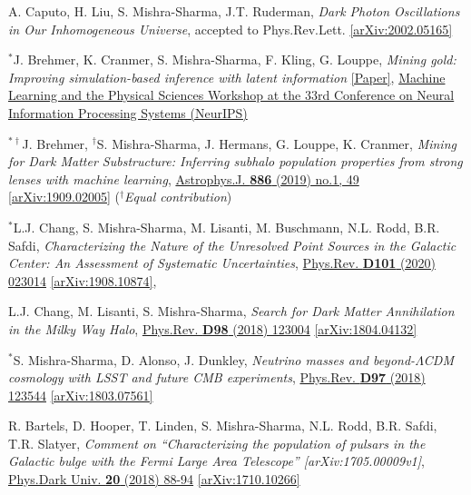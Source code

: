 \documentclass[11pt]{article}
\newenvironment{packed_enumerate}[1][]{
\begin{etaremune}[#1]
  \setlength{\itemsep}{3pt}
  \setlength{\parskip}{0pt}
  \setlength{\parsep}{0pt}}{\end{etaremune}
}
\begin{document}
\begin{packed_enumerate}[start=24]
\item A. Caputo, H. Liu, S. Mishra-Sharma, J.T. Ruderman, \emph{Dark Photon Oscillations in Our Inhomogeneous Universe}, accepted to Phys.Rev.Lett. \href{https://arxiv.org/abs/2002.05165}{[arXiv:2002.05165]}

\item $^*$J. Brehmer, K. Cranmer, S. Mishra-Sharma, F. Kling, G. Louppe,  \emph{Mining gold: Improving simulation-based inference with latent information} \href{https://ml4physicalsciences.github.io/files/NeurIPS_ML4PS_2019_16.pdf}{[Paper]}, \href{https://ml4physicalsciences.github.io/}{Machine Learning and the Physical Sciences Workshop at the 33rd Conference on Neural Information Processing Systems (NeurIPS)}

\item $^{*\dagger}$J. Brehmer, $^\dagger$S. Mishra-Sharma, J. Hermans, G. Louppe, K. Cranmer, \emph{Mining for Dark Matter Substructure: Inferring subhalo population properties from strong lenses with machine learning}, \href{https://iopscience.iop.org/article/10.3847/1538-4357/ab4c41}{Astrophys.J. \textbf{886} (2019) no.1, 49} \href{https://arxiv.org/abs/1909.02005}{[arXiv:1909.02005]} ($^\dagger$\emph{Equal contribution})

\item $^*$L.J. Chang, S. Mishra-Sharma, M. Lisanti, M. Buschmann, N.L. Rodd, B.R. Safdi, \emph{Characterizing the Nature of the Unresolved Point Sources in the Galactic Center: An Assessment of Systematic Uncertainties},  \href{https://journals.aps.org/prd/abstract/10.1103/PhysRevD.101.023014}{Phys.Rev. \textbf{D101} (2020) 023014} \href{https://arxiv.org/abs/1908.10874}{[arXiv:1908.10874]}, 

\item L.J. Chang, M. Lisanti, S. Mishra-Sharma, \emph{Search for Dark Matter Annihilation in the Milky Way Halo}, \href{https://journals.aps.org/prd/abstract/10.1103/PhysRevD.98.123004}{Phys.Rev. \textbf{D98} (2018) 123004} \href{https://arxiv.org/abs/1804.04132}{[arXiv:1804.04132]}

\item $^*$S. Mishra-Sharma, D. Alonso, J. Dunkley, \emph{Neutrino masses and beyond-$\Lambda$CDM cosmology with LSST and future CMB experiments}, \href{https://journals.aps.org/prd/abstract/10.1103/PhysRevD.97.123544}{Phys.Rev. \textbf{D97} (2018) 123544}  \href{https://arxiv.org/abs/1803.07561}{[arXiv:1803.07561]}

\item R. Bartels, D. Hooper, T. Linden, S. Mishra-Sharma, N.L. Rodd, B.R. Safdi, T.R. Slatyer, \emph{Comment on ``Characterizing the population of pulsars in the Galactic bulge with the
{\it Fermi} Large Area Telescope'' [arXiv:1705.00009\MakeLowercase{v}1]}, \href{https://www.sciencedirect.com/science/article/pii/S2212686418300268}{Phys.Dark Univ. \textbf{20} (2018) 88-94} \href{https://arxiv.org/abs/1710.10266}{[arXiv:1710.10266]}


\end{packed_enumerate}
\end{document}
